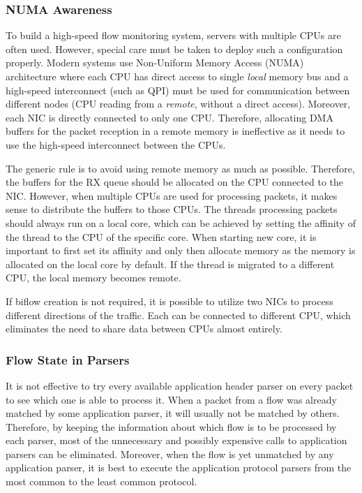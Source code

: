 \subsubsection{NUMA Awareness}

To build a high-speed flow monitoring system, servers with multiple CPUs are often used. However, special care must be taken to deploy such a configuration properly. Modern systems use Non-Uniform Memory Access (NUMA) architecture where each CPU has direct access to single \emph{local} memory bus and a high-speed interconnect (such as QPI) must be used for communication between different nodes (CPU reading from a \emph{remote}, without a direct access). Moreover, each NIC is directly connected to only one CPU. Therefore, allocating DMA buffers for the packet reception in a remote memory is ineffective as it needs to use the high-speed interconnect between the CPUs.

The generic rule is to avoid using remote memory as much as possible. Therefore, the buffers for the RX queue should be allocated on the CPU connected to the NIC. However, when multiple CPUs are used for processing packets, it makes sense to distribute the buffers to those CPUs. The threads processing packets should always run on a local core, which can be achieved by setting the affinity of the thread to the CPU of the specific core. When starting new core, it is important to first set its affinity and only then allocate memory as the memory is allocated on the local core by default. If the thread is migrated to a different CPU, the local memory becomes remote.

If biflow creation is not required, it is possible to utilize two NICs to process different directions of the traffic. Each can be connected to different CPU, which eliminates the need to share data between CPUs almost entirely.

\subsubsection{Flow State in Parsers}

It is not effective to try every available application header parser on every packet to see which one is able to process it. When a packet from a flow was already matched by some application parser, it will usually not be matched by others. Therefore, by keeping the information about which flow is to be processed by each parser, most of the unnecessary and possibly expensive calls to application parsers can be eliminated. Moreover, when the flow is yet unmatched by any application parser, it is best to execute the application protocol parsers from the most common to the least common protocol.

